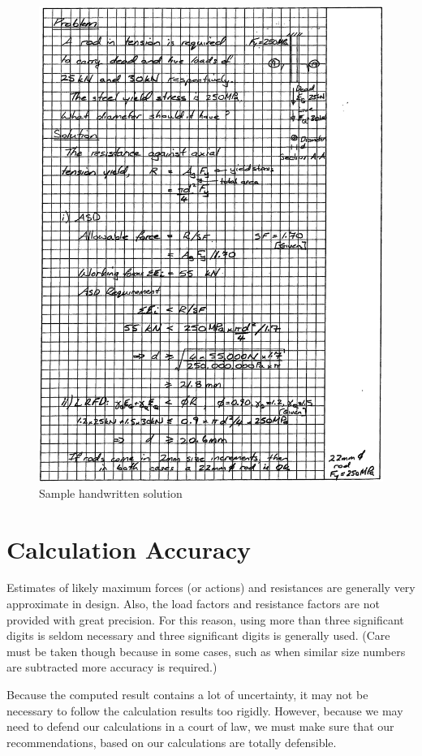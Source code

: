 \begin{figure}[H]
\centering
\includegraphics[width=.99\textwidth]{PIC/CH01/SAMPLE}
\caption{Sample handwritten solution}
\end{figure}
\section{Calculation Accuracy}
Estimates of likely maximum forces (or actions) and resistances are generally very approximate in design. Also, the load factors and resistance factors are not provided with great precision. For this reason, using more than three significant digits is seldom necessary and three significant digits is generally used. (Care must be taken though because in some cases, such as when similar size numbers are subtracted more accuracy is required.)

Because the computed result contains a lot of uncertainty, it may not be necessary to follow the calculation results too rigidly. However, because we may need to defend our calculations in a court of law, we must make sure that our recommendations, based on our calculations are totally defensible.

